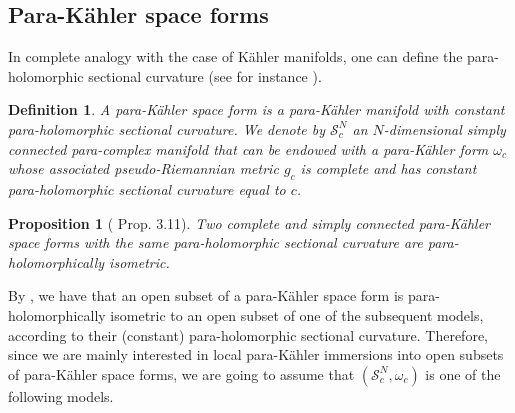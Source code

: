 \documentclass[11pt, reqno]{amsart}
\newtheorem{df}[theor]{Definition}
\newtheorem{prop}[theor]{Proposition}
\newcommand{\s}{\mathcal{S}}
\newcommand{\dd}{\mathrm{D}}
\newcommand{\K }{K\"{a}hler }
\newcommand{\pk }{para-K\"{a}hler }
\begin{document}
%
%


\subsection{Para-\K space forms}
In complete analogy with the case of K\"ahler manifolds, one can define the para-holomorphic sectional curvature (see for instance \cite{gm}). 
\begin{df}
A \emph{\pk space form} is a \pk manifold with constant para-holomorphic sectional curvature. 
We denote by $\s_c^N$ an $N$-dimensional simply connected para-complex manifold that can be endowed  with a \pk form $\omega_c$ whose associated pseudo-Riemannian metric $g_c$ is complete and has constant para-holomorphic sectional curvature equal to $c$.
\end{df}



\begin{prop}[\cite{gm} Prop. 3.11]
Two complete and simply connected \pk space forms with the same para-holomorphic sectional curvature are para-holomorphically isometric. 
\end{prop}

\noindent By \cite{gm}, we have that  an open subset of a \pk space form is para-holomorphically isometric to an open subset of one  of the subsequent models, according to their (constant) para-holomorphic sectional curvature. Therefore, since we are mainly interested in local \pk immersions into open subsets of \pk space forms, we are going to assume that  $\left(\s_c^N,\omega_c\right)$  is  one of the following models.
 
\end{document}
